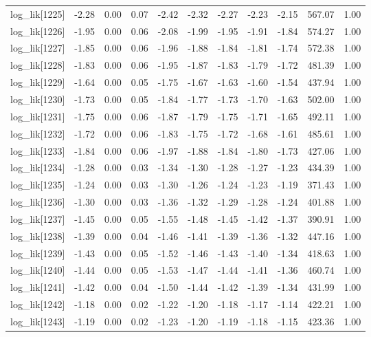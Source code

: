 \begin{table}[ht]
\begin{tabular}{rrrrrrrrrrr}
  log\_lik[1225] & -2.28 & 0.00 & 0.07 & -2.42 & -2.32 & -2.27 & -2.23 & -2.15 & 567.07 & 1.00 \\ 
  log\_lik[1226] & -1.95 & 0.00 & 0.06 & -2.08 & -1.99 & -1.95 & -1.91 & -1.84 & 574.27 & 1.00 \\ 
  log\_lik[1227] & -1.85 & 0.00 & 0.06 & -1.96 & -1.88 & -1.84 & -1.81 & -1.74 & 572.38 & 1.00 \\ 
  log\_lik[1228] & -1.83 & 0.00 & 0.06 & -1.95 & -1.87 & -1.83 & -1.79 & -1.72 & 481.39 & 1.00 \\ 
  log\_lik[1229] & -1.64 & 0.00 & 0.05 & -1.75 & -1.67 & -1.63 & -1.60 & -1.54 & 437.94 & 1.00 \\ 
  log\_lik[1230] & -1.73 & 0.00 & 0.05 & -1.84 & -1.77 & -1.73 & -1.70 & -1.63 & 502.00 & 1.00 \\ 
  log\_lik[1231] & -1.75 & 0.00 & 0.06 & -1.87 & -1.79 & -1.75 & -1.71 & -1.65 & 492.11 & 1.00 \\ 
  log\_lik[1232] & -1.72 & 0.00 & 0.06 & -1.83 & -1.75 & -1.72 & -1.68 & -1.61 & 485.61 & 1.00 \\ 
  log\_lik[1233] & -1.84 & 0.00 & 0.06 & -1.97 & -1.88 & -1.84 & -1.80 & -1.73 & 427.06 & 1.00 \\ 
  log\_lik[1234] & -1.28 & 0.00 & 0.03 & -1.34 & -1.30 & -1.28 & -1.27 & -1.23 & 434.39 & 1.00 \\ 
  log\_lik[1235] & -1.24 & 0.00 & 0.03 & -1.30 & -1.26 & -1.24 & -1.23 & -1.19 & 371.43 & 1.00 \\ 
  log\_lik[1236] & -1.30 & 0.00 & 0.03 & -1.36 & -1.32 & -1.29 & -1.28 & -1.24 & 401.88 & 1.00 \\ 
  log\_lik[1237] & -1.45 & 0.00 & 0.05 & -1.55 & -1.48 & -1.45 & -1.42 & -1.37 & 390.91 & 1.00 \\ 
  log\_lik[1238] & -1.39 & 0.00 & 0.04 & -1.46 & -1.41 & -1.39 & -1.36 & -1.32 & 447.16 & 1.00 \\ 
  log\_lik[1239] & -1.43 & 0.00 & 0.05 & -1.52 & -1.46 & -1.43 & -1.40 & -1.34 & 418.63 & 1.00 \\ 
  log\_lik[1240] & -1.44 & 0.00 & 0.05 & -1.53 & -1.47 & -1.44 & -1.41 & -1.36 & 460.74 & 1.00 \\ 
  log\_lik[1241] & -1.42 & 0.00 & 0.04 & -1.50 & -1.44 & -1.42 & -1.39 & -1.34 & 431.99 & 1.00 \\ 
  log\_lik[1242] & -1.18 & 0.00 & 0.02 & -1.22 & -1.20 & -1.18 & -1.17 & -1.14 & 422.21 & 1.00 \\ 
  log\_lik[1243] & -1.19 & 0.00 & 0.02 & -1.23 & -1.20 & -1.19 & -1.18 & -1.15 & 423.36 & 1.00 \\ 

\end{tabular}
\end{table}
